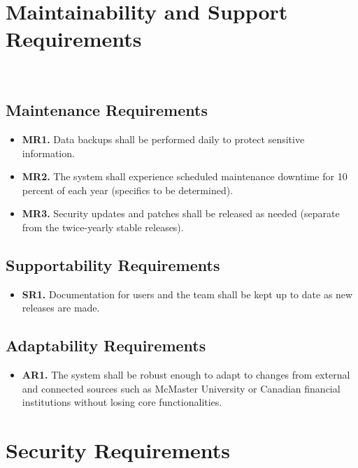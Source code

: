 \documentclass[12pt]{article}
\begin{document}
\section{Maintainability and Support Requirements}\

\label{MaintainSupport}

\subsection{Maintenance Requirements}

\label{MR}

\begin{itemize}
    \item \textbf{MR1.} Data backups shall be performed daily to protect sensitive information.
    \item \textbf{MR2.} The system shall experience scheduled maintenance downtime for 10 percent of each year (specifics to be determined).
    \item \textbf{MR3.} Security updates and patches shall be released as needed (separate from the twice-yearly stable releases).
\end{itemize}

\subsection{Supportability Requirements}

\label{SR}

\begin{itemize}
    \item \textbf{SR1.} Documentation for users and the team shall be kept up to date as new releases are made.
\end{itemize}

\subsection{Adaptability Requirements}

\label{AR}

\begin{itemize}
    \item \textbf{AR1.} The system shall be robust enough to adapt to changes from external and connected sources such as McMaster University or Canadian financial institutions without losing core functionalities.
\end{itemize}

\section{Security Requirements}
\end{document}
